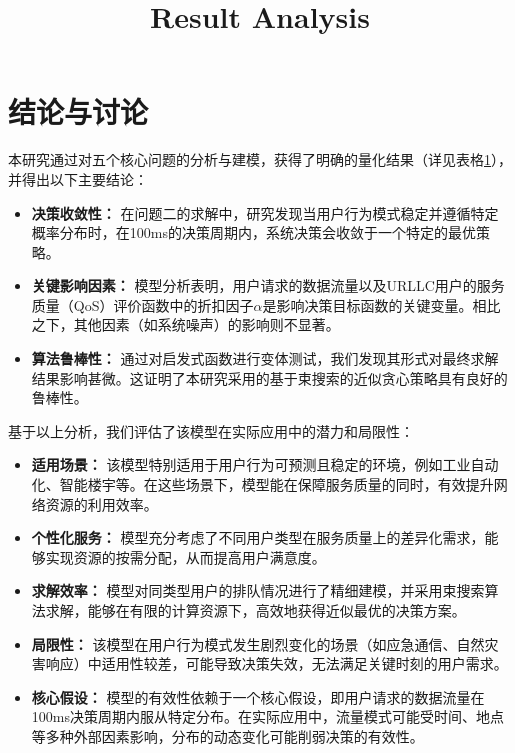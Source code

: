 \documentclass{article}
\title{Result Analysis}
\begin{document}
\maketitle
\section{结论与讨论}
本研究通过对五个核心问题的分析与建模，获得了明确的量化结果（详见表格\ref{}），并得出以下主要结论：
\begin{itemize}
    \item \textbf{决策收敛性：} 在问题二的求解中，研究发现当用户行为模式稳定并遵循特定概率分布时，在100ms的决策周期内，系统决策会收敛于一个特定的最优策略。
    \item \textbf{关键影响因素：} 模型分析表明，用户请求的数据流量以及URLLC用户的服务质量（QoS）评价函数中的折扣因子$\alpha$是影响决策目标函数的关键变量。相比之下，其他因素（如系统噪声）的影响则不显著。
    \item \textbf{算法鲁棒性：} 通过对启发式函数进行变体测试，我们发现其形式对最终求解结果影响甚微。这证明了本研究采用的基于束搜索的近似贪心策略具有良好的鲁棒性。
\end{itemize}

基于以上分析，我们评估了该模型在实际应用中的潜力和局限性：
\begin{itemize}
    \item \textbf{适用场景：} 该模型特别适用于用户行为可预测且稳定的环境，例如工业自动化、智能楼宇等。在这些场景下，模型能在保障服务质量的同时，有效提升网络资源的利用效率。
    \item \textbf{个性化服务：} 模型充分考虑了不同用户类型在服务质量上的差异化需求，能够实现资源的按需分配，从而提高用户满意度。
    \item \textbf{求解效率：} 模型对同类型用户的排队情况进行了精细建模，并采用束搜索算法求解，能够在有限的计算资源下，高效地获得近似最优的决策方案。
    \item \textbf{局限性：} 该模型在用户行为模式发生剧烈变化的场景（如应急通信、自然灾害响应）中适用性较差，可能导致决策失效，无法满足关键时刻的用户需求。
    \item \textbf{核心假设：} 模型的有效性依赖于一个核心假设，即用户请求的数据流量在100ms决策周期内服从特定分布。在实际应用中，流量模式可能受时间、地点等多种外部因素影响，分布的动态变化可能削弱决策的有效性。
\end{itemize}
\end{document}

